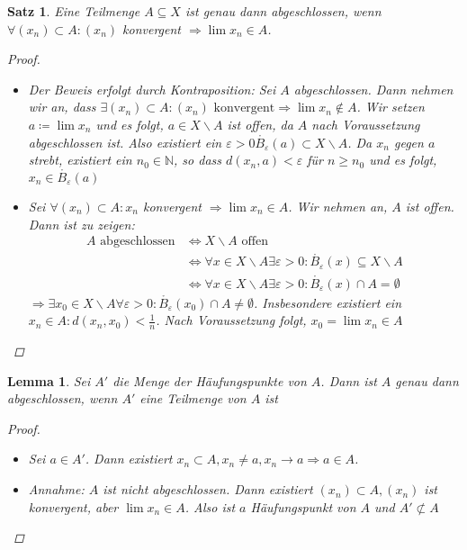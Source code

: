 \documentclass[ngerman,titlepage,twoside, parskip=half*]{scrreprt}
\newcommand*{\N}{\mathbb{N}}
\theoremstyle{break}
\newtheorem{lemma}{Lemma}
\newtheorem{theorem}{Satz}[section]
\theoremstyle{nonumberbreak}
\newtheorem{proof}{Beweis:}
\begin{document}
\begin{theorem}\label{satz:abgTeilmenge}
  Eine Teilmenge $A\subseteq X$ ist genau dann abgeschlossen, wenn $\forall
  (x_n) \subset A\colon(x_n)$ konvergent $\Rightarrow \lim x_n \in A$.
  \begin{proof}
    \begin{itemize}
     \item["`$\Rightarrow$"'] Der Beweis erfolgt durch Kontraposition: Sei $A$
      abgeschlossen. Dann nehmen wir an, dass $\exists (x_n)\subset
      A\colon(x_n) \text{ konvergent} \Rightarrow \lim x_n \notin A$. Wir
      setzen $a\coloneqq\lim x_n$ und es folgt, $a \in X\backslash A$ ist
      offen, da $A$ nach Voraussetzung abgeschlossen ist. Also existiert ein
      $\varepsilon >0 \mathring{B_{\varepsilon}}(a)\subset X\backslash A$. Da
      $x_n$ gegen $a$ strebt, existiert ein $n_0\in \N$, so dass
      $d(x_n,a)<\varepsilon$ für $n\geq n_0$ und es folgt, $x_n \in
      \mathring{B_{\varepsilon}}(a)$\lightning
     \item["`$\Leftarrow$"'] Sei $\forall (x_n)\subset A\colon x_n$ konvergent
      $\Rightarrow \lim x_n \in A$. Wir nehmen an, $A$ ist offen. Dann ist zu
      zeigen:
    \begin{align*}
      A \text{ abgeschlossen} &\Leftrightarrow X\backslash A \text{ offen}\\
      &\Leftrightarrow \forall x \in X\backslash A \exists \varepsilon >0\colon\mathring{B_{\varepsilon}}
      (x)\subseteq X\backslash A\\
      &\Leftrightarrow \forall x \in X\backslash A \exists \varepsilon >0\colon\mathring{B_{\varepsilon}}
      (x)\cap A = \emptyset
    \end{align*}
    $\Rightarrow \exists x_0 \in X\backslash A \forall \varepsilon
      >0\colon\mathring{B_{\varepsilon}}(x_0) \cap A \neq \emptyset$.
      Insbesondere existiert ein $x_n \in A \colon d(x_n,x_0)<\frac{1}{n}$.
      Nach Voraussetzung folgt, $x_0=\lim x_n \in A$\lightning
    \end{itemize}
  \end{proof}
\end{theorem}

\begin{lemma}
  Sei $A'$ die Menge der Häufungspunkte von $A$. Dann ist $A$ genau dann
  abgeschlossen, wenn $A'$ eine Teilmenge von $A$ ist
  \begin{proof}
    \begin{itemize}
     \item["`$\Rightarrow$"'] Sei $a\in A'$. Dann existiert $x_n \subset A,
      x_n\neq a, x_n\rightarrow a \Rightarrow a \in A$.
  \item["`$\Leftarrow$"'] Annahme: $A$ ist nicht abgeschlossen. Dann existiert
      $(x_n) \subset A, (x_n)$ ist konvergent, aber $\lim x_n\in A$. Also ist
      $a$ Häufungspunkt von $A$ und $A'\not\subset A$\lightning
\end{itemize}
  \end{proof}
\end{lemma}
\end{document}
